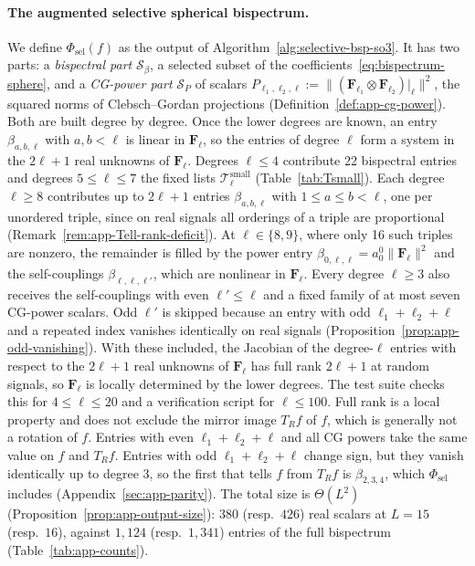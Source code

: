 \documentclass{article}
\theoremstyle{definition}
\theoremstyle{remark}
\theoremstyle{definition}
\begin{document}
\paragraph{The augmented selective spherical bispectrum.} We define
$\Phi_{\mathrm{sel}}(f)$ as the output of
Algorithm~\ref{alg:selective-bsp-so3}. It has two parts: a
\emph{bispectral part} $\mathcal{S}_\beta$, a selected subset of the
coefficients~\eqref{eq:bispectrum-sphere}, and a \emph{CG-power part}
$\mathcal{S}_P$ of scalars
$P_{\ell_1,\ell_2,\ell} := \lVert(\mathbf{F}_{\ell_1}\otimes
\mathbf{F}_{\ell_2})|_\ell\rVert^2$, the squared norms of
Clebsch--Gordan projections (Definition~\ref{def:app-cg-power}).
Both are built degree by degree. Once the lower degrees are known, an entry
$\beta_{a,b,\ell}$ with $a,b<\ell$ is linear in $\mathbf{F}_\ell$, so the entries of
degree $\ell$ form a system in the $2\ell{+}1$ real unknowns of $\mathbf{F}_\ell$.
Degrees $\ell\le 4$ contribute 22 bispectral entries and degrees $5\le\ell\le 7$ the fixed
lists $\mathcal{T}^{\mathrm{small}}_\ell$ (Table~\ref{tab:Tsmall}). Each degree $\ell\ge 8$
contributes up to $2\ell{+}1$ entries $\beta_{a,b,\ell}$ with $1\le a\le b<\ell$,
one per unordered triple, since on real signals all orderings of a
triple are proportional (Remark~\ref{rem:app-Tell-rank-deficit}). At $\ell\in\{8,9\}$,
where only 16 such triples are nonzero, the remainder is filled by the power entry
$\beta_{0,\ell,\ell}=a_0^0\lVert\mathbf{F}_\ell\rVert^2$ and the self-couplings
$\beta_{\ell,\ell,\ell'}$, which are nonlinear in $\mathbf{F}_\ell$. Every degree $\ell\ge 3$
also receives the self-couplings with even $\ell'\le\ell$ and a fixed family of at most seven
CG-power scalars. Odd $\ell'$ is skipped because an entry with odd $\ell_1{+}\ell_2{+}\ell$
and a repeated index vanishes identically on real signals
(Proposition~\ref{prop:app-odd-vanishing}). With these included, the Jacobian of the
degree-$\ell$ entries with respect to the $2\ell{+}1$ real unknowns of $\mathbf{F}_\ell$ has
full rank $2\ell{+}1$ at random signals, so $\mathbf{F}_\ell$ is locally determined by the
lower degrees. The test suite checks this for $4\le\ell\le 20$ and a verification script for
$\ell\le 100$. Full rank is a local property and does not exclude the mirror image $T_R f$
of $f$, which is generally not a rotation of $f$. Entries with even $\ell_1{+}\ell_2{+}\ell$
and all CG powers take the same value on $f$ and $T_R f$. Entries with odd
$\ell_1{+}\ell_2{+}\ell$ change sign, but they vanish identically up to degree 3, so the
first that tells $f$ from $T_R f$ is $\beta_{2,3,4}$, which $\Phi_{\mathrm{sel}}$ includes
(Appendix~\ref{sec:app-parity}). The total size is $\Theta(L^2)$
(Proposition~\ref{prop:app-output-size}): $380$ (resp.\ $426$) real
scalars at $L=15$ (resp.\ $16$), against $1{,}124$ (resp.\
$1{,}341$) entries of the full bispectrum
(Table~\ref{tab:app-counts}).
\end{document}
